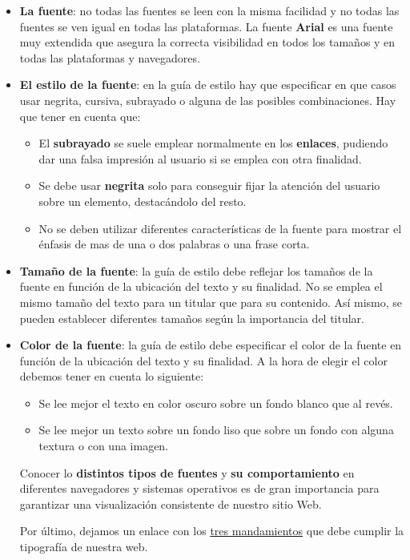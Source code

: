\begin{itemize}
    \item \textbf{La fuente}: no todas las fuentes se leen con la misma facilidad y no todas las fuentes se ven igual en todas las plataformas. La fuente \textbf{Arial} es una fuente muy extendida que asegura la correcta visibilidad en todos los tamaños y en todas las plataformas y navegadores.

    \item \textbf{El estilo de la fuente}: en la guía de estilo hay que especificar en que casos usar negrita, cursiva, subrayado o alguna de las posibles combinaciones. Hay que tener en cuenta que:

    \begin{itemize}
        \item El \textbf{subrayado} se suele emplear normalmente en los \textbf{enlaces}, pudiendo dar una falsa impresión al usuario si se emplea con otra finalidad.
        \item Se debe usar \textbf{negrita} solo para conseguir fijar la atención del usuario sobre un elemento, destacándolo del resto.
        \item No se deben utilizar diferentes características de la fuente para mostrar el énfasis de mas de una o dos palabras o una frase corta.
    \end{itemize}

    \item \textbf{Tamaño de la fuente}: la guía de estilo debe reflejar los tamaños de la fuente en función de la ubicación del texto y su finalidad. No se emplea el mismo tamaño del texto para un titular que para su contenido. Así mismo, se pueden establecer diferentes tamaños según la importancia del titular.

    \item \textbf{Color de la fuente}: la guía de estilo debe especificar el color de la fuente en función de la ubicación del texto y su finalidad. A la hora de elegir el color debemos tener en cuenta lo siguiente:

    \begin{itemize}
        \item Se lee mejor el texto en color oscuro sobre un fondo blanco que al revés.
        \item Se lee mejor un texto sobre un fondo liso que sobre un fondo con alguna textura o con una imagen.
    \end{itemize}

    Conocer lo \textbf{distintos tipos de fuentes} y \textbf{su comportamiento} en diferentes navegadores y sistemas operativos es de gran importancia para garantizar una visualización consistente de nuestro sitio Web.

    Por último, dejamos un enlace con los \href{https://mejoratucopy.com/tipografias-para-web/}{tres mandamientos} que debe cumplir la tipografía de nuestra web.
\end{itemize}

